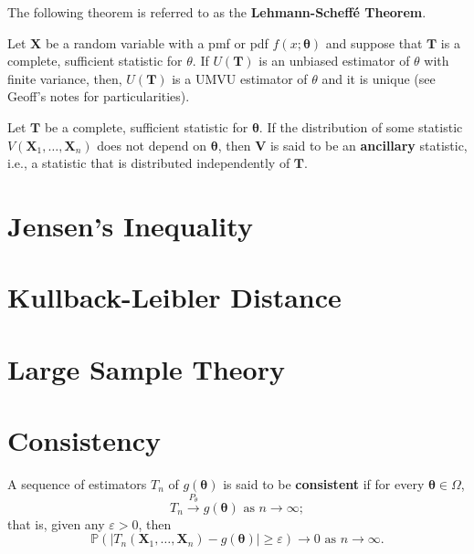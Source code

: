 The following theorem is referred to as the \textbf{Lehmann-Scheff\'{e} Theorem}.

\begin{theorem}[Theorem 2]\label{thm:thm 2 UMVU}
    Let \(\bm{X}\) be a random variable with a pmf or pdf \(f(x;\bm{\theta})\) and suppose that \(\bm{T}\) is a complete, sufficient statistic for \(\theta\). 
    If \(U(\bm{T})\) is an unbiased estimator of \(\theta\) with finite variance, 
    then, \(U(\bm{T})\) is a UMVU estimator of \(\theta\) and it is unique (see Geoff's notes for particularities).
\end{theorem}

\begin{theorem}\label{thm:Basu's}
    Let \(\bm{T}\) be a complete, sufficient statistic for \(\bm{\theta}\). 
    If the distribution of some statistic \(V(\bm{X}_1,\ldots,\bm{X}_n)\) does not depend on \(\bm{\theta}\), 
    then \(\bm{V}\) is said to be an \textbf{ancillary} statistic, i.e., a statistic that is distributed independently of \(\bm{T}\).
\end{theorem}

\section{Jensen's Inequality}\label{sec:Jensen's ineq}



\section{Kullback-Leibler Distance}\label{sec:Kullback-Leibler}



\section{Large Sample Theory}\label{sec:large sample theory}


\section{Consistency}\label{sec:consistency}

\begin{definition}[Consistent]\label{defn:consistent}
    A sequence of estimators \(T_n\) of \(g(\bm{\theta})\) is said to be \textbf{consistent} if for every \(\bm{\theta}\in\Omega\), 
    \begin{equation*}
        T_n \overset{P_\theta}{\to} g(\bm{\theta})\text{ as } n\to\infty;
    \end{equation*}
    that is, given any \(\varepsilon>0\), then 
    \begin{equation*}
        \mathbb{P}\left(|T_n(\bm{X}_1,\ldots,\bm{X}_n) - g(\bm{\theta})| \geq \varepsilon \right) \to 0\text{ as } n\to\infty.
    \end{equation*}
\end{definition}

